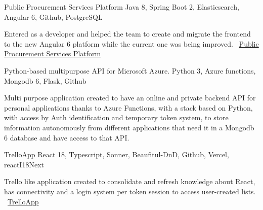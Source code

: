 \documentclass[]{awesome-cv}
\begin{document}
\begin{cventries}
	\vspace{-3mm}
	\cventry
	{}
	{Public Procurement Services Platform \vspace{-5mm}}
	{Java 8, Spring Boot 2, Elasticsearch, Angular 6, Github, PostgreSQL \vspace{-5mm}}
	{}
	{\begin{sectionnormaltext}
		\item{Entered as a developer and helped the team to create and migrate the frontend to the new Angular 6 platform while the current one was being improved.
		\newline \faLink\ \href{https://contractaciopublica.cat/ca/inici}{Public Procurement Services Platform}}
	\end{sectionnormaltext}}
 
    \cventry
	{}
	{Python-based multipurpose API for Microsoft Azure. \vspace{-5mm}}
	{Python 3, Azure functions, Mongodb 6, Flask, Github \vspace{-5mm}}
	{}
	{\begin{sectionnormaltext}
		\item{Multi purpose application created to have an online and private backend API for personal applications thanks to Azure Functions, with a stack based on Python, with access by Auth identification and temporary token system, to store information autonomously from different applications that need it in a Mongodb 6 database and have access to that API.
		\newline}
	\end{sectionnormaltext}}

    \cventry
	{}
	{TrelloApp \vspace{-5mm}}
	{React 18, Typescript, Sonner, Beaufitul-DnD, Github, Vercel, reactI18Next \vspace{-5mm}}
	{}
	{\begin{sectionnormaltext}
		\item{Trello like application created to consolidate and refresh knowledge about React, has connectivity and a login system per token session to access user-created lists.
		\newline \faLink\ \href{https://trello-app-giacconidev.vercel.app/user/login}{TrelloApp}}
	\end{sectionnormaltext}}
 
	\vspace{-5mm}
\end{cventries}
\end{document}
